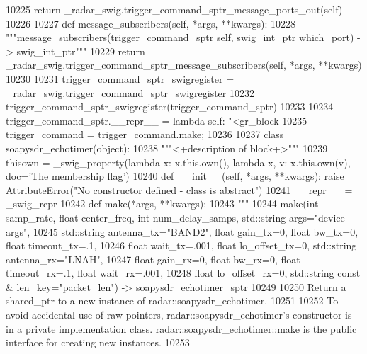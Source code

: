 \begin{DoxyCode}
{{{{{{{{{{{{{{{{{{{{{{{{{{{{{{{{10225         \textcolor{keywordflow}{return} \_radar\_swig.trigger\_command\_sptr\_message\_ports\_out(self)
10226 
10227     \textcolor{keyword}{def }message_subscribers(self, *args, **kwargs):
10228         \textcolor{stringliteral}{"""message\_subscribers(trigger\_command\_sptr self, swig\_int\_ptr which\_port) -> swig\_int\_ptr"""}
10229         \textcolor{keywordflow}{return} \_radar\_swig.trigger\_command\_sptr\_message\_subscribers(self, *args, **kwargs)
10230 
10231 trigger\_command\_sptr\_swigregister = \_radar\_swig.trigger\_command\_sptr\_swigregister
10232 trigger_command_sptr_swigregister(trigger\_command\_sptr)
10233 
10234 trigger\_command\_sptr.\_\_repr\_\_ = \textcolor{keyword}{lambda} self: \textcolor{stringliteral}{"<gr\_block %
10235 trigger\_command = trigger\_command.make;
10236 
10237 \textcolor{keyword}{class }soapysdr_echotimer(object):
10238     \textcolor{stringliteral}{"""<+description of block+>"""}
10239     thisown = _swig_property(\textcolor{keyword}{lambda} x: x.this.own(), \textcolor{keyword}{lambda} x, v: x.this.own(v), doc=\textcolor{stringliteral}{'The membership flag'})
10240     \textcolor{keyword}{def }__init__(self, *args, **kwargs): \textcolor{keywordflow}{raise} AttributeError(\textcolor{stringliteral}{"No constructor defined - class is abstract"})
10241     \_\_repr\_\_ = \_swig\_repr
10242     \textcolor{keyword}{def }make(*args, **kwargs):
10243         \textcolor{stringliteral}{"""}
10244 \textcolor{stringliteral}{        make(int samp\_rate, float center\_freq, int num\_delay\_samps, std::string args="device args", }
10245 \textcolor{stringliteral}{            std::string antenna\_tx="BAND2", float gain\_tx=0, float bw\_tx=0, float timeout\_tx=.1, }
10246 \textcolor{stringliteral}{            float wait\_tx=.001, float lo\_offset\_tx=0, std::string antenna\_rx="LNAH", }
10247 \textcolor{stringliteral}{            float gain\_rx=0, float bw\_rx=0, float timeout\_rx=.1, float wait\_rx=.001, }
10248 \textcolor{stringliteral}{            float lo\_offset\_rx=0, std::string const & len\_key="packet\_len") -> soapysdr\_echotimer\_sptr}
10249 \textcolor{stringliteral}{}
10250 \textcolor{stringliteral}{        Return a shared\_ptr to a new instance of radar::soapysdr\_echotimer.}
10251 \textcolor{stringliteral}{}
10252 \textcolor{stringliteral}{        To avoid accidental use of raw pointers, radar::soapysdr\_echotimer's constructor is in a private
       implementation class. radar::soapysdr\_echotimer::make is the public interface for creating new instances.}
10253 \textcolor{stringliteral}{}
}}}}}}}}}}}}}}}}}}}}}}}}}}}}}}}}}
\end{DoxyCode}

